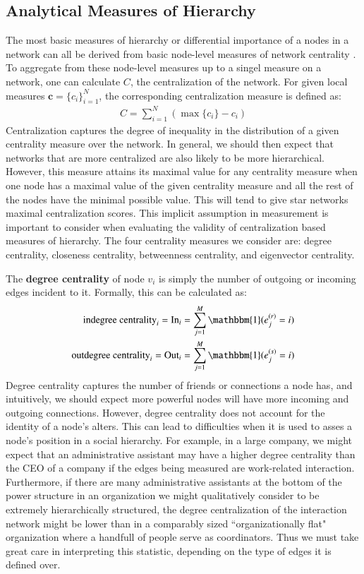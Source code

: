 \documentclass[3p,times]{elsarticle}
\begin{document}
\subsection{Analytical Measures of Hierarchy}
The most basic measures of hierarchy or differential importance of a nodes in a network can all be derived from basic node-level measures of network centrality \cite{Wasserman1994}. To aggregate from these node-level measures up to a singel measure on a network, one can calculate $C$, the centralization of the network. For given local measures $\mathbf{c} = \{c_i\}_{i=1}^N$, the corresponding centralization measure is defined as: 
\begin{align}
	C = \sum_{i=1}^{N}{(\max\{c_{i}\}-c_{i})}
\end{align}
Centralization captures the degree of inequality in the distribution of a given centrality measure over the network. In general, we should then expect that networks that are more centralized are also likely to be more hierarchical. However, this measure attains its maximal value for any centrality measure when one node has a maximal value of the given centrality measure and all the rest of the nodes have the minimal possible value. This will tend to give star networks maximal centralization scores. This implicit assumption in measurement is important to consider when evaluating the validity of centralization based measures of hierarchy. The four centrality measures we consider are: degree centrality, closeness centrality, betweenness centrality, and eigenvector centrality. 

The \textbf{degree centrality} of node $v_{i}$ is simply the number of outgoing or incoming edges incident to it. Formally, this can be calculated as:
\begin{align}
	\text{indegree centrality}_i = \text{In}_i&= \sum_{j=1}^M \mathbbm{1}(e_j^{(r)} = i) \\
	\text{outdegree centrality}_i  = \text{Out}_i &= \sum_{j=1}^M \mathbbm{1}(e_j^{(s)} = i) 
\end{align}
Degree centrality captures the number of friends or connections a node has, and intuitively, we should expect more powerful nodes will have more incoming and outgoing connections. However, degree centrality does not account for the identity of a node's alters. This can lead to difficulties when it is used to asses a node's position in a social hierarchy. For example, in a large company, we might expect that an administrative assistant may have a higher degree centrality than the CEO of a company if the edges being measured are work-related interaction. Furthermore, if there are many administrative assistants at the bottom of the power structure in an organization we might qualitatively consider to be extremely hierarchically structured, the degree centralization of the interaction network might be lower than in a comparably sized ``organizationally flat" organization where a handfull of people serve as coordinators. Thus we must take great care in interpreting this statistic, depending on the type of edges it is defined over. 
\end{document}
